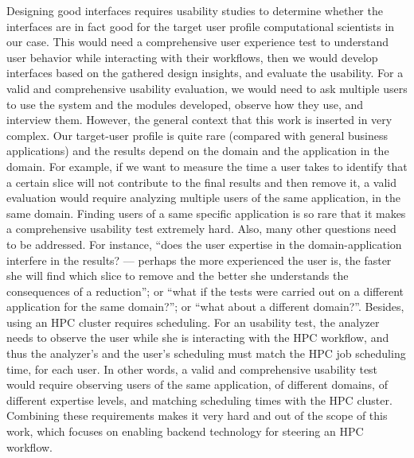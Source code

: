 Designing good interfaces requires usability studies to determine
whether the interfaces are in fact good for the target user profile \ie{} computational scientists in our case.
This would need a
comprehensive user experience test to understand user behavior while
interacting with their workflows, then we would develop interfaces based
on the gathered design insights, and evaluate the usability. For a valid
and comprehensive usability evaluation, we would need to ask multiple
users to use the system and the modules developed, observe how they use,
and interview them. However, the general context that this work is inserted in
very complex. Our target-user profile is quite rare (compared with general
business applications) and the results depend on the domain and the
application in the domain. For example, if we want to measure the time a
user takes to identify that a certain slice will not contribute to the
final results and then remove it, a valid evaluation would require
analyzing multiple users of the same application, in the same domain.
Finding users of a same specific application is so rare that it makes a
comprehensive usability test extremely hard. Also, many other questions
need to be addressed. For instance, ``does the user expertise in the
domain-application interfere in the results? --- perhaps the more
experienced the user is, the faster she will find which slice to remove
and the better she understands the consequences of a reduction''; or
``what if the tests were carried out on a different application for the
same domain?''; or ``what about a different domain?''. Besides, using an HPC cluster requires scheduling. For an usability test, the analyzer needs to observe the user while she is
interacting with the HPC workflow, and thus the analyzer's and the
user's scheduling must match the HPC job scheduling time, for each user.
In other words, a valid and comprehensive usability test would require
observing users of the same application, of different domains, of
different expertise levels, and matching scheduling times with the HPC
cluster. Combining these requirements makes it very hard and out of the
scope of this work, which focuses on enabling backend technology for
steering an HPC workflow.


